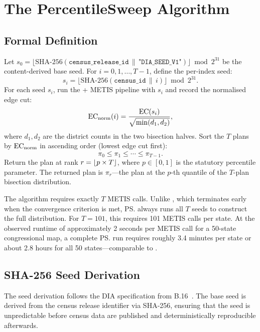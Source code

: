 \section{The PercentileSweep Algorithm}
\label{sec:algorithm}

\subsection{Formal Definition}

\begin{definition}[\ps{}$(p, T)$]
\label{def:percentile-sweep}
Let $s_0 = \lfloor \text{SHA-256}(\texttt{census\_release\_id} \,\|\,
\texttt{"DIA\_SEED\_V1"}) \rfloor \bmod 2^{31}$ be the content-derived base seed.
For $i = 0, 1, \ldots, T-1$, define the per-index seed:
\[
  s_i = \lfloor \text{SHA-256}(\texttt{census\_id} \,\|\, i) \rfloor \bmod 2^{31}.
\]
For each seed $s_i$, run the \ar{} + METIS pipeline with $s_i$ and record
the normalised edge cut:
\[
  \mathrm{EC}_{\mathrm{norm}}(i) = \frac{\mathrm{EC}(s_i)}{\sqrt{\min(d_1, d_2)}},
\]
where $d_1, d_2$ are the district counts in the two bisection halves.
Sort the $T$ plans by $\mathrm{EC}_{\mathrm{norm}}$ in ascending order (lowest edge cut first):
\[
  \pi_0 \leq \pi_1 \leq \cdots \leq \pi_{T-1}.
\]
Return the plan at rank $r = \lfloor p \times T \rfloor$, where $p \in [0, 1]$
is the statutory percentile parameter.
The returned plan is $\pi_r$---the plan at the $p$-th quantile of the
$T$-plan bisection distribution.
\end{definition}

The algorithm requires exactly $T$ METIS calls.
Unlike \cs{}, which terminates early when the convergence criterion is
met, \ps{} always runs all $T$ seeds to construct the full distribution.
For $T = 101$, this requires 101 METIS calls per state.
At the observed runtime of approximately 2 seconds per METIS call for
a 50-state congressional map, a complete \ps{} run requires roughly 3.4
minutes per state or about 2.8 hours for all 50 states---comparable to
\cs{}.

\subsection{SHA-256 Seed Derivation}

The seed derivation follows the DIA specification from B.16~\citep{b16paper}.
The base seed is derived from the census release identifier via SHA-256,
ensuring that the seed is unpredictable before census data are published
and deterministically reproducible afterwards.

